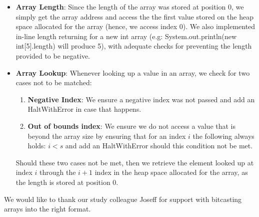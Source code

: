 \documentclass[paper=a4, fontsize=11pt]{scrartcl}
\numberwithin{equation}{section}		%
\numberwithin{figure}{section}			%
\numberwithin{table}{section}				%
\begin{document}
\begin{itemize}
\item \textbf{Array Length}: Since the length of the array was stored at position 0, we simply get the array address and access the the first value stored on the heap space allocated for the array (hence, we access index 0). We also implemented in-line length returning for a new int array  (e.g: System.out.println(new int[5].length) will produce 5), with adequate checks for preventing the length provided to be negative. 
\item \textbf{Array Lookup}: Whenever looking up a value in an array, we check for two cases not to be matched:
\begin{enumerate}
	\item \textbf{Negative Index}: We ensure a negative index was not passed and add an HaltWithError in case that happens. 
	\item \textbf{Out of bounds index}: We ensure we do not access a value that is beyond the array size by ensuring that for an index $i$ the following always holds: $i < s$ and add an HaltWithError should this condition not be met.
\end{enumerate}
Should these two cases not be met, then we retrieve the element looked up at index $i$ through the $i + 1$ index in the heap space allocated for the array, as the length is stored at position 0.

\end{itemize}


\begin{thebibliography}{9}%
We would like to thank our study colleague Joseff for support with bitcasting arrays into the right format.
\end{thebibliography}
\end{document}

